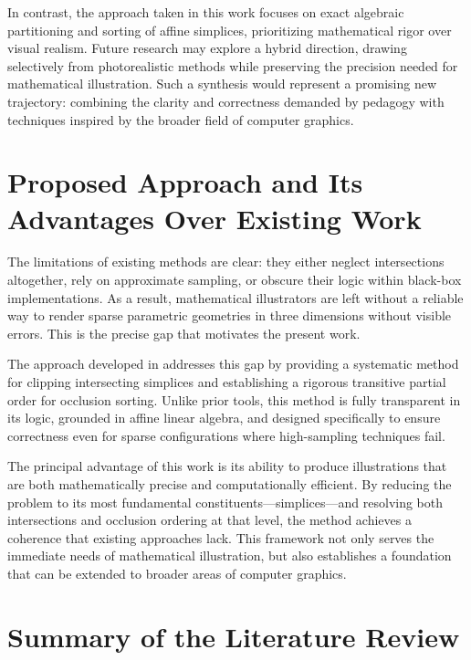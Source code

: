 In contrast, the approach taken in this work focuses on exact 
algebraic partitioning and sorting of affine simplices, prioritizing 
mathematical rigor over visual realism. Future research may explore 
a hybrid direction, drawing selectively from photorealistic methods 
while preserving the precision needed for mathematical illustration. 
Such a synthesis would represent a promising new trajectory: 
combining the clarity and correctness demanded by pedagogy with 
techniques inspired by the broader field of computer graphics.

\section{Proposed Approach and Its Advantages Over Existing Work}

The limitations of existing methods are clear: they either neglect 
intersections altogether, rely on approximate sampling, or obscure 
their logic within black-box implementations. As a result, 
mathematical illustrators are left without a reliable way to render 
sparse parametric geometries in three dimensions without visible 
errors. This is the precise gap that motivates the present work. 

The approach developed in \luatikztdtools{} addresses this gap by 
providing a systematic method for clipping intersecting simplices 
and establishing a rigorous transitive partial order for occlusion 
sorting. Unlike prior tools, this method is fully transparent in its 
logic, grounded in affine linear algebra, and designed specifically 
to ensure correctness even for sparse configurations where 
high-sampling techniques fail. 

The principal advantage of this work is its ability to produce 
illustrations that are both mathematically precise and computationally 
efficient. By reducing the problem to its most fundamental 
constituents—simplices—and resolving both intersections and 
occlusion ordering at that level, the method achieves a coherence 
that existing approaches lack. This framework not only serves the 
immediate needs of mathematical illustration, but also establishes a 
foundation that can be extended to broader areas of computer graphics.

\section{Summary of the Literature Review}

